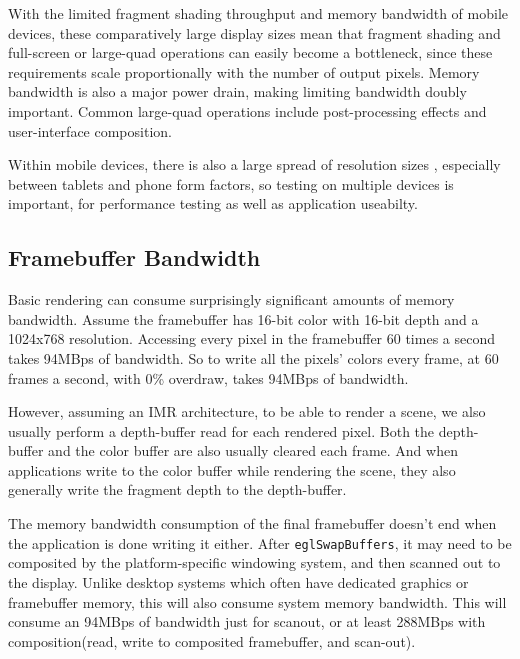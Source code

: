 
With the limited fragment shading throughput and memory bandwidth of mobile
devices, these comparatively large display sizes mean that fragment shading and
full-screen or large-quad operations can easily become a bottleneck, since
these requirements scale proportionally with the number of output pixels.
Memory bandwidth is also a major power drain, making limiting bandwidth doubly
important.  Common large-quad operations include post-processing effects and user-interface composition.

Within mobile devices, there is also a large spread of resolution sizes
, especially between tablets and phone form factors, so testing
on multiple devices is important, for performance testing as well as
application useabilty.

\subsection{Framebuffer Bandwidth}\label{Jon-McCaffrey-Framebuffer-Bandwidth}

Basic rendering can consume surprisingly significant amounts of memory
bandwidth.  Assume the framebuffer has 16-bit color with 16-bit depth
\cite{Google11} and a 1024x768 resolution.  Accessing every pixel in the
framebuffer 60 times a second takes 94MBps of bandwidth.  So to write all the
pixels' colors every frame, at 60 frames a second, with 0\%
overdraw, takes 94MBps of bandwidth.

 

However, assuming an IMR architecture, to be able to render a scene, we also
usually perform a depth-buffer read for each rendered pixel.  Both the
depth-buffer and the color buffer are also usually cleared each frame.  And
when applications write to the color buffer while rendering the scene, they
also generally write the fragment depth to the depth-buffer.

The memory bandwidth consumption of the final framebuffer doesn't end when the
application is done writing it either.  After \texttt{eglSwapBuffers}, it may
need to be composited by the platform-specific windowing system, and then
scanned out to the display.  Unlike desktop systems which often have
dedicated graphics or framebuffer memory, this will also consume system memory
bandwidth.  This will consume an 94MBps of bandwidth just for
scanout, or at least 288MBps with composition(read, write to
composited framebuffer, and scan-out).

